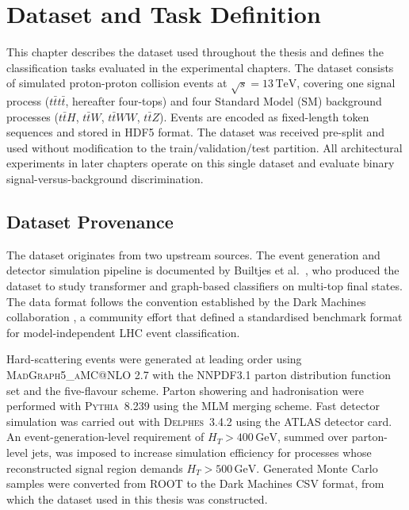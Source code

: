 \chapter{Dataset and Task Definition}
\label{chapter:dataset}

This chapter describes the dataset used throughout the thesis and defines the classification
tasks evaluated in the experimental chapters. The dataset consists of simulated
proton-proton collision events at $\sqrt{s} = 13\,\text{TeV}$, covering one signal process
($t\bar{t}t\bar{t}$, hereafter four-tops) and four Standard Model (SM) background processes
($t\bar{t}H$, $t\bar{t}W$, $t\bar{t}WW$, $t\bar{t}Z$). Events are encoded as fixed-length
token sequences and stored in HDF5 format. The dataset was received pre-split and used
without modification to the train/validation/test partition. All architectural experiments
in later chapters operate on this single dataset and evaluate binary signal-versus-background
discrimination.

\section{Dataset Provenance}
\label{sec:dataset_provenance}

The dataset originates from two upstream sources. The event generation and detector
simulation pipeline is documented by Builtjes et al.\
\cite{builtjesAttentionStrengthsPhysical2025}, who produced the dataset to study
transformer and graph-based classifiers on multi-top final states. The data format follows
the convention established by the Dark Machines collaboration \cite{Aarrestad:2021oeb}, a
community effort that defined a standardised benchmark format for model-independent LHC
event classification.

Hard-scattering events were generated at leading order using \textsc{MadGraph5\_aMC@NLO}
2.7 with the NNPDF3.1 parton distribution function set and the five-flavour scheme. Parton
showering and hadronisation were performed with \textsc{Pythia}~8.239 using the MLM merging
scheme. Fast detector simulation was carried out with \textsc{Delphes}~3.4.2 using the
ATLAS detector card. An event-generation-level requirement of $H_T > 400\,\text{GeV}$,
summed over parton-level jets, was imposed to increase simulation efficiency for processes
whose reconstructed signal region demands $H_T > 500\,\text{GeV}$. Generated Monte Carlo
samples were converted from ROOT to the Dark Machines CSV format, from which the dataset
used in this thesis was constructed.

